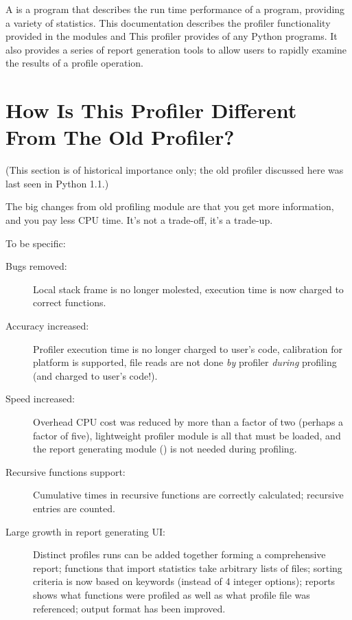 A  is a program that describes the run time performance
of a program, providing a variety of statistics.  This documentation
describes the profiler functionality provided in the modules
 and   This profiler provides
 of any Python programs.  It also
provides a series of report generation tools to allow users to rapidly
examine the results of a profile operation.


\section{How Is This Profiler Different From The Old Profiler?}

(This section is of historical importance only; the old profiler
discussed here was last seen in Python 1.1.)

The big changes from old profiling module are that you get more
information, and you pay less CPU time.  It's not a trade-off, it's a
trade-up.

To be specific:

\begin{description}

\item[Bugs removed:]
Local stack frame is no longer molested, execution time is now charged
to correct functions.

\item[Accuracy increased:]
Profiler execution time is no longer charged to user's code,
calibration for platform is supported, file reads are not done \emph{by}
profiler \emph{during} profiling (and charged to user's code!).

\item[Speed increased:]
Overhead CPU cost was reduced by more than a factor of two (perhaps a
factor of five), lightweight profiler module is all that must be
loaded, and the report generating module () is not needed
during profiling.

\item[Recursive functions support:]
Cumulative times in recursive functions are correctly calculated;
recursive entries are counted.

\item[Large growth in report generating UI:]
Distinct profiles runs can be added together forming a comprehensive
report; functions that import statistics take arbitrary lists of
files; sorting criteria is now based on keywords (instead of 4 integer
options); reports shows what functions were profiled as well as what
profile file was referenced; output format has been improved.

\end{description}


